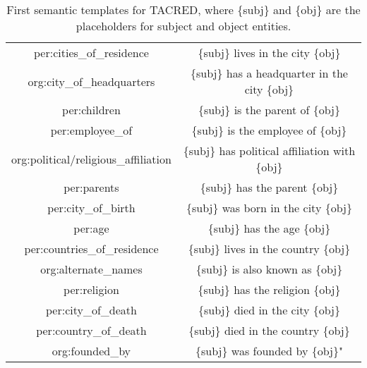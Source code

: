 \begin{table*}[h]
\begin{threeparttable}
\begin{tabular}{cc}
per:cities\_of\_residence & \{subj\} lives in the city \{obj\}\\
org:city\_of\_headquarters & \{subj\} has a headquarter in the city \{obj\}\\
per:children & \{subj\} is the parent of \{obj\}\\
per:employee\_of & \{subj\} is the employee of \{obj\}\\
org:political/religious\_affiliation & \{subj\} has political affiliation with \{obj\}\\
per:parents & \{subj\} has the parent \{obj\}\\
per:city\_of\_birth & \{subj\} was born in the city \{obj\}\\
per:age & \{subj\} has the age \{obj\}\\
per:countries\_of\_residence & \{subj\} lives in the country \{obj\}\\
org:alternate\_names & \{subj\} is also known as \{obj\}\\
per:religion & \{subj\} has the religion \{obj\}\\
per:city\_of\_death & \{subj\} died in the city \{obj\}\\
per:country\_of\_death & \{subj\} died in the country \{obj\}\\
org:founded\_by & \{subj\} was founded by \{obj\}"\\
    \bottomrule
    \end{tabular}
    \end{threeparttable}
    \caption{First semantic templates for TACRED, where \{subj\} and \{obj\} are the placeholders for subject and object entities.}
    \label{tab:semantic1-templates}
\end{table*}

